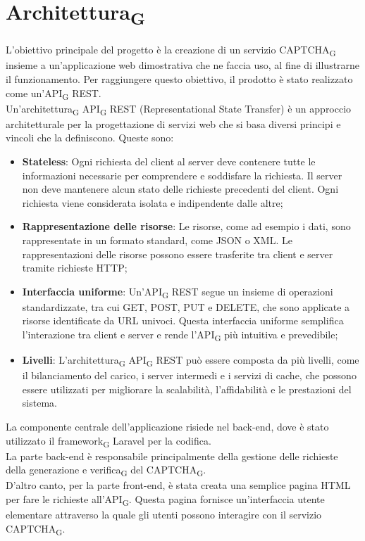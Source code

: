 \section{Architettura\textsubscript{G}}
L'obiettivo principale del progetto è la creazione di un servizio CAPTCHA\textsubscript{G} insieme a un'applicazione web 
dimostrativa che ne faccia uso, al fine di illustrarne il funzionamento. Per raggiungere questo obiettivo, 
il prodotto è stato realizzato come un'API\textsubscript{G} REST.\\
Un'architettura\textsubscript{G} API\textsubscript{G} REST (Representational State Transfer) è un approccio architetturale per la progettazione di servizi web che si basa diversi principi e vincoli che la definiscono.
Queste sono:
\begin{itemize}
	\item \textbf{Stateless}: Ogni richiesta del client al server deve contenere tutte le informazioni necessarie per comprendere e soddisfare la richiesta. Il server non deve mantenere alcun stato delle richieste precedenti del client. Ogni richiesta viene considerata isolata e indipendente dalle altre;
	\item \textbf{Rappresentazione delle risorse}: Le risorse, come ad esempio i dati, sono rappresentate in un formato standard, come JSON o XML. Le rappresentazioni delle risorse possono essere trasferite tra client e server tramite richieste HTTP;
	\item \textbf{Interfaccia uniforme}:  Un'API\textsubscript{G} REST segue un insieme di operazioni standardizzate, tra cui GET, POST, PUT e DELETE, che sono applicate a risorse identificate da URL univoci. Questa interfaccia uniforme semplifica l'interazione tra client e server e rende l'API\textsubscript{G} più intuitiva e prevedibile;
	\item \textbf{Livelli}:  L'architettura\textsubscript{G} API\textsubscript{G} REST può essere composta da più livelli, come il bilanciamento del carico, i server intermedi e i servizi di cache, che possono essere utilizzati per migliorare la scalabilità, l'affidabilità e le prestazioni del sistema.
\end{itemize}

La componente centrale dell'applicazione risiede nel back-end, dove è stato utilizzato il framework\textsubscript{G} Laravel per la codifica.\\
La parte back-end è responsabile principalmente della gestione delle richieste della generazione e verifica\textsubscript{G} del CAPTCHA\textsubscript{G}. \\
D'altro canto, per la parte front-end, è stata creata una semplice pagina HTML per fare le richieste all'API\textsubscript{G}. Questa pagina fornisce un'interfaccia utente elementare attraverso la quale gli utenti possono interagire con il servizio CAPTCHA\textsubscript{G}.

